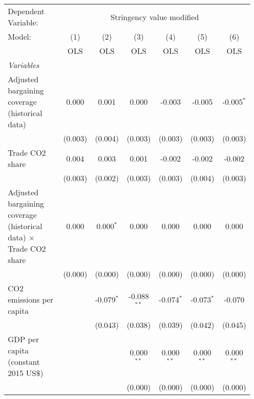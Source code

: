 
\begingroup
\centering
\begin{tabular}{lcccccc}
   \toprule
   Dependent Variable: & \multicolumn{6}{c}{Stringency value modified}\\
   Model:                                                                   & (1)     & (2)          & (3)           & (4)          & (5)          & (6)\\  
                                                                            &  OLS    & OLS          & OLS           & OLS          & OLS          & OLS\\  
   \midrule
   \emph{Variables}\\
   Adjusted bargaining coverage (historical data)                           & 0.000   & 0.001        & 0.000         & -0.003       & -0.005       & -0.005$^{*}$\\   
                                                                            & (0.003) & (0.004)      & (0.003)       & (0.003)      & (0.003)      & (0.003)\\   
   Trade CO2 share                                                          & 0.004   & 0.003        & 0.001         & -0.002       & -0.002       & -0.002\\   
                                                                            & (0.003) & (0.002)      & (0.003)       & (0.003)      & (0.004)      & (0.003)\\   
   Adjusted bargaining coverage (historical data) $\times$ Trade CO2 share  & 0.000   & 0.000$^{*}$  & 0.000         & 0.000        & 0.000        & 0.000\\   
                                                                            & (0.000) & (0.000)      & (0.000)       & (0.000)      & (0.000)      & (0.000)\\   
   CO2 emissions per capita                                                 &         & -0.079$^{*}$ & -0.088$^{**}$ & -0.074$^{*}$ & -0.073$^{*}$ & -0.070\\   
                                                                            &         & (0.043)      & (0.038)       & (0.039)      & (0.042)      & (0.045)\\   
   GDP per capita (constant 2015 US\$)                                      &         &              & 0.000$^{**}$  & 0.000$^{**}$ & 0.000$^{**}$ & 0.000$^{**}$\\   
                                                                            &         &              & (0.000)       & (0.000)      & (0.000)      & (0.000)\\   

\end{tabular}
